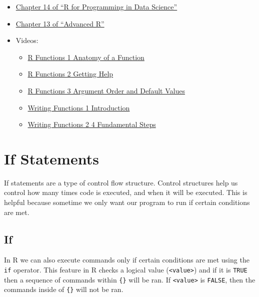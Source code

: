 \documentclass[
]{book}
\providecommand{\tightlist}{%
  \setlength{\itemsep}{0pt}\setlength{\parskip}{0pt}}
\begin{document}
\begin{itemize}
\tightlist
\item
  \href{https://bookdown.org/rdpeng/rprogdatascience/functions.html\#the-...-argument}{Chapter 14 of ``R for Programming in Data Science''}
\item
  \href{https://adv-r.hadley.nz/s3.html}{Chapter 13 of ``Advanced R''}
\item
  Videos:

  \begin{itemize}
  \tightlist
  \item
    \href{https://ucr.yuja.com/V/Video?v=2390137\&node=8588230\&a=1409376127\&autoplay=1}{R Functions 1 \textbar{} Anatomy of a Function}
  \item
    \href{https://ucr.yuja.com/V/Video?v=2368890\&node=8488096\&a=1477744713\&autoplay=1}{R Functions 2 \textbar{} Getting Help}
  \item
    \href{https://ucr.yuja.com/V/Video?v=2368889\&node=8488095\&a=762120086\&autoplay=1}{R Functions 3 \textbar{} Argument Order and Default Values}
  \item
    \href{https://ucr.yuja.com/V/Video?v=2700489\&node=9649685\&a=1404409900\&autoplay=1}{Writing Functions 1 \textbar{} Introduction}
  \item
    \href{https://ucr.yuja.com/V/Video?v=2700492\&node=9649688\&a=604881114\&autoplay=1}{Writing Functions 2 \textbar{} 4 Fundamental Steps}
  \end{itemize}
\end{itemize}

\hypertarget{if-statements}{%
\chapter{If Statements}\label{if-statements}}

If statements are a type of control flow structure. Control structures help us control how many times code is executed, and when it will be executed. This is helpful because sometime we only want our program to run if certain conditions are met.

\hypertarget{if}{%
\section{If}\label{if}}

In R we can also execute commands only if certain conditions are met using the \texttt{if} operator. This feature in R checks a logical value (\texttt{\textless{}value\textgreater{}}) and if it is \texttt{TRUE} then a sequence of commands within \texttt{\{\}} will be ran. If \texttt{\textless{}value\textgreater{}} is \texttt{FALSE}, then the commands inside of \texttt{\{\}} will not be ran.
\end{document}
